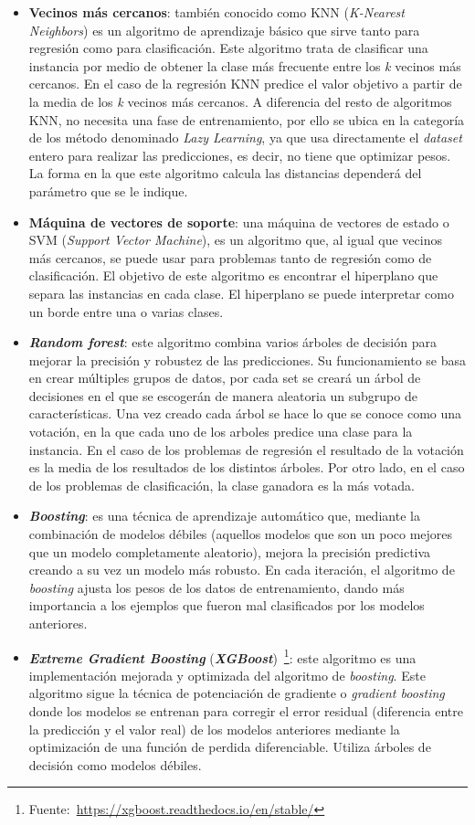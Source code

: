 \begin{itemize}
\item \textbf{Vecinos más cercanos}: también conocido como KNN (\textit{K-Nearest Neighbors}) es un algoritmo de aprendizaje básico que sirve tanto para regresión como para clasificación. Este algoritmo trata de clasificar una instancia por medio de obtener la clase más frecuente entre los \textit{k} vecinos más cercanos. En el caso de la regresión KNN predice el valor objetivo a partir de la media de los \textit{k} vecinos más cercanos. A diferencia del resto de algoritmos KNN, no necesita una fase de entrenamiento, por ello se ubica en la categoría de los método denominado \textit{Lazy Learning}, ya que usa directamente el \textit{dataset} entero para realizar las predicciones, es decir, no tiene que optimizar pesos. La forma en la que este algoritmo calcula las distancias dependerá del parámetro que se le indique.
\item \textbf{Máquina de vectores de soporte}: una máquina de vectores de estado o SVM (\textit{Support Vector Machine}), es un algoritmo que, al igual que vecinos más cercanos, se puede usar para problemas tanto de regresión como de clasificación. El objetivo de este algoritmo es encontrar el hiperplano que separa las instancias en cada clase. El hiperplano se puede interpretar como un borde entre una o varias clases. 
\item \textbf{\textit{Random forest}}: este algoritmo combina varios árboles de decisión para mejorar la precisión y robustez de las predicciones. Su funcionamiento se basa en crear múltiples grupos de datos, por cada set se creará un árbol de decisiones en el que se escogerán de manera aleatoria un subgrupo de características. Una vez creado cada árbol se hace lo que se conoce como una votación, en la que cada uno de los arboles predice una clase para la instancia. En el caso de los problemas de regresión el resultado de la votación es la media de los resultados de los distintos árboles. Por otro lado, en el caso de los problemas de clasificación, la clase ganadora es la más votada.

\item \textbf{\textit{Boosting}}: es una técnica de aprendizaje automático que, mediante la combinación de modelos débiles (aquellos modelos que son un poco mejores que un modelo completamente aleatorio), mejora la precisión predictiva creando a su vez un modelo más robusto. En cada iteración, el algoritmo de \textit{boosting} ajusta los pesos de los datos de entrenamiento, dando más importancia a los ejemplos que fueron mal clasificados por los modelos anteriores.

\item \textbf{\textit{Extreme Gradient Boosting}} (\textbf{\textit{XGBoost}})~\footnote{Fuente:~\url{https://xgboost.readthedocs.io/en/stable/}}: este algoritmo es una implementación mejorada y optimizada del algoritmo de \textit{boosting}. Este algoritmo sigue la técnica de potenciación de gradiente o \textit{gradient boosting} donde los modelos se entrenan para corregir el error residual (diferencia entre la predicción y el valor real) de los modelos anteriores mediante la optimización de una función de perdida diferenciable. Utiliza árboles de decisión como modelos débiles.
\end{itemize}
